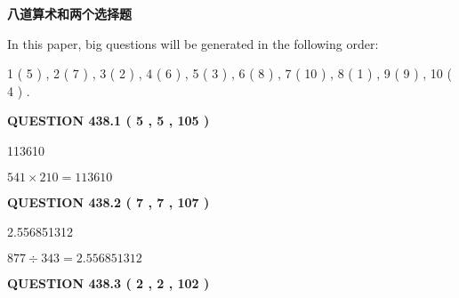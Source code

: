 \documentclass{ctexart}
\begin{document}
   
\vspace{0.2in}
   
   
   
   
   
   
 \vspace{0.2in}
{\LARGE {\textbf{ 八道算术和两个选择题}}}
   
   
   
\vspace{0.2in}
   
In this paper, big questions will be generated in the following order: 
   
   
   1 ( 5 )
 ,
   2 ( 7 )
 ,
   3 ( 2 )
 ,
   4 ( 6 )
 ,
   5 ( 3 )
 ,
   6 ( 8 )
 ,
   7 ( 10 )
 ,
   8 ( 1 )
 ,
   9 ( 9 )
 ,
   10 ( 4 )
 .
  
\vspace{0.2in}
  
{\textbf{\Large{QUESTION
438.1 
 ( 5 , 5 , 105 )
}}}
  
  
 
 
\noindent{}

113610
 
 
 
 
\noindent{}

$ %
541 \times  %
210=   %
113610$
 
 
  
\vspace{0.2in}
  
{\textbf{\Large{QUESTION
438.2 
 ( 7 , 7 , 107 )
}}}
  
  
 
 
\noindent{}

2.556851312
 
 
 
 
\noindent{}

$ %
877 \div  %
343=   %
2.556851312$
 
 
  
\vspace{0.2in}
  
{\textbf{\Large{QUESTION
438.3 
 ( 2 , 2 , 102 )
}}}
  
  
 
\end{document}
